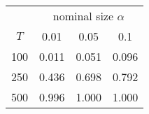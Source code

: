 % 
\begin{tabular}{cccc}
  \hline
  & \multicolumn{3}{c}{nominal size $\alpha$} \\
 $T$ & 0.01 & 0.05 & 0.1 \\
 \hline
100 & 0.011 & 0.051 & 0.096 \\ 
  250 & 0.436 & 0.698 & 0.792 \\ 
  500 & 0.996 & 1.000 & 1.000 \\ 
   \hline
\end{tabular}
